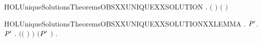 \newcommand{\HOLUniqueSolutionsTheoremsOBSXXunfoldingXXlemmaFour}{\UseVerbatim{HOLUniqueSolutionsTheoremsOBSXXunfoldingXXlemmaFour}}
\begin{SaveVerbatim}{HOLUniqueSolutionsTheoremsOBSXXUNIQUEXXSOLUTION}
\HOLTokenTurnstile{} \HOLSymConst{\HOLTokenForall{}}  .
         \HOLSymConst{\HOLTokenConj{}}   \HOLSymConst{\HOLTokenConj{}}   \ensuremath{(} \ensuremath{)} \HOLSymConst{\HOLTokenConj{}}   \ensuremath{(} \ensuremath{)} \HOLSymConst{\HOLTokenImp{}}
         
\end{SaveVerbatim}
\newcommand{\HOLUniqueSolutionsTheoremsOBSXXUNIQUEXXSOLUTION}{\UseVerbatim{HOLUniqueSolutionsTheoremsOBSXXUNIQUEXXSOLUTION}}
\begin{SaveVerbatim}{HOLUniqueSolutionsTheoremsOBSXXUNIQUEXXSOLUTIONXXLEMMA}
\HOLTokenTurnstile{} \HOLSymConst{\HOLTokenForall{}}.
         \HOLSymConst{\HOLTokenConj{}}   \HOLSymConst{\HOLTokenImp{}}
       \HOLSymConst{\HOLTokenForall{}}  \ensuremath{\HOLBoundVar{P}\sp{\prime}}.
             \HOLTokenTransBegin{}\HOLTokenTransEnd \ensuremath{\HOLBoundVar{P}\sp{\prime}} \HOLSymConst{\HOLTokenImp{}}
           \HOLSymConst{\HOLTokenExists{}}.
                 \HOLSymConst{\HOLTokenConj{}} \ensuremath{(}\ensuremath{(} \HOLSymConst{\ensuremath{=}} \HOLConst{\ensuremath{\tau}}\ensuremath{)} \HOLSymConst{\HOLTokenImp{}}  \ensuremath{)} \HOLSymConst{\HOLTokenConj{}} \ensuremath{(}\ensuremath{\HOLBoundVar{P}\sp{\prime}} \HOLSymConst{\ensuremath{=}}  \ensuremath{)} \HOLSymConst{\HOLTokenConj{}}
               \HOLSymConst{\HOLTokenForall{}}.   \HOLTokenTransBegin{}\HOLTokenTransEnd {} 
\end{SaveVerbatim}
\newcommand{\HOLUniqueSolutionsTheoremsOBSXXUNIQUEXXSOLUTIONXXLEMMA}{\UseVerbatim{HOLUniqueSolutionsTheoremsOBSXXUNIQUEXXSOLUTIONXXLEMMA}}
